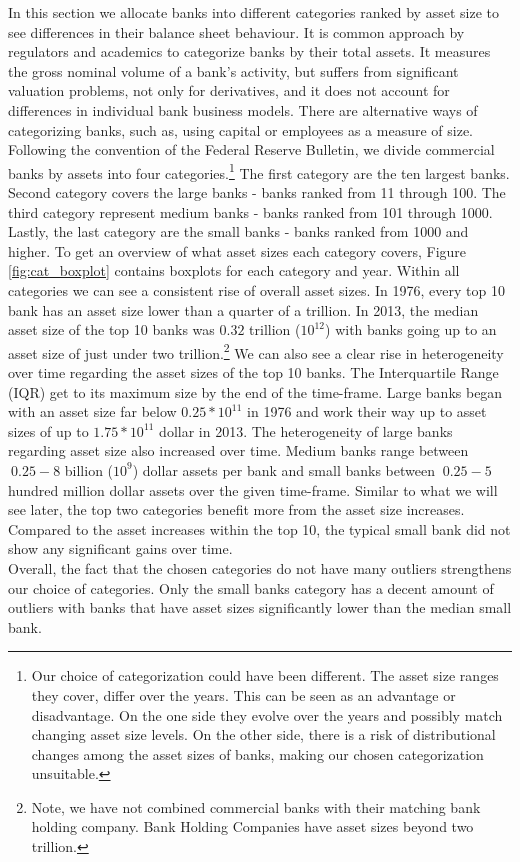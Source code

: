 \documentclass[12pt, a4paper]{article} %
\begin{document}
In this section we allocate banks into different categories ranked by asset size to see differences in their balance sheet behaviour. It is common approach by regulators and academics to categorize banks by their total assets. It measures the gross nominal volume of a bank's activity, but suffers from significant valuation problems, not only for derivatives, and it does not account for differences in individual bank business models. There are alternative ways of categorizing banks, such as, using capital or employees as a measure of size. \\
Following the convention of the Federal Reserve Bulletin, we divide commercial banks by assets into four categories.\footnote{Our choice of categorization could have been different. The asset size ranges they cover, differ over the years. This can be seen as an advantage or disadvantage. On the one side they evolve over the years and possibly match changing asset size levels. On the other side, there is a risk of distributional changes among the asset sizes of banks, making our chosen categorization unsuitable.} The first category are the ten largest banks. Second category covers the large banks - banks ranked from 11 through 100. The third category represent medium banks - banks ranked from 101 through 1000. Lastly, the last category are the small banks - banks ranked from 1000 and higher.
To get an overview of what asset sizes each category covers, Figure \ref{fig:cat_boxplot} contains boxplots for each category and year. Within all categories we can see a consistent rise of overall asset sizes.
In 1976, every top 10 bank has an asset size lower than a quarter of a trillion.
In 2013, the median asset size of the top 10 banks was $0.32$ trillion ($10^{12}$) with banks going up to an asset size of just under two trillion.\footnote{Note, we have not combined commercial banks with their matching bank holding company. Bank Holding Companies have asset sizes beyond two trillion.} We can also see a clear rise in heterogeneity over time regarding the asset sizes of the top 10 banks. The Interquartile Range (IQR) get to its maximum size by the end of the time-frame.
Large banks began with an asset size far below $0.25*10^{11}$ in 1976 and work their way up to asset sizes of up to $1.75*10^{11}$ dollar in 2013. The heterogeneity of large banks regarding asset size also increased over time.
Medium banks range between $~0.25-8$ billion ($10^{9}$) dollar assets per bank and small banks between $~0.25-5$ hundred million dollar assets over the given time-frame. Similar to what we will see later, the top two categories benefit more from the asset size increases. Compared to the asset increases within the top 10, the typical small bank did not show any significant gains over time. \\
Overall, the fact that the chosen categories do not have many outliers strengthens our choice of categories. Only the small banks category has a decent amount of outliers with banks that have asset sizes significantly lower than the median small bank. 
\end{document}
